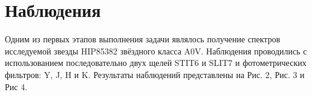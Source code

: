 \documentclass[a4paper]{article}
\begin{document}
\section{Наблюдения}
Одним из первых этапов выполнения задачи являлось получение спектров исследуемой звезды HIP85382 звёздного класса A0V. Наблюдения проводились с использованием последовательно двух щелей STIT6 и SLIT7 и фотометрических фильтров: Y, J, H и K. Результаты наблюдений представлены на Рис. 2, Рис. 3 и Рис 4.
\begin{figure}[h]
\begin{minipage}[h]{0.50\linewidth}
\end{minipage}
\begin{minipage}[h]{0.50\linewidth}
\end{minipage}
\begin{minipage}[h]{0.50\linewidth}

\end{minipage}
\end{figure}
\end{document}
